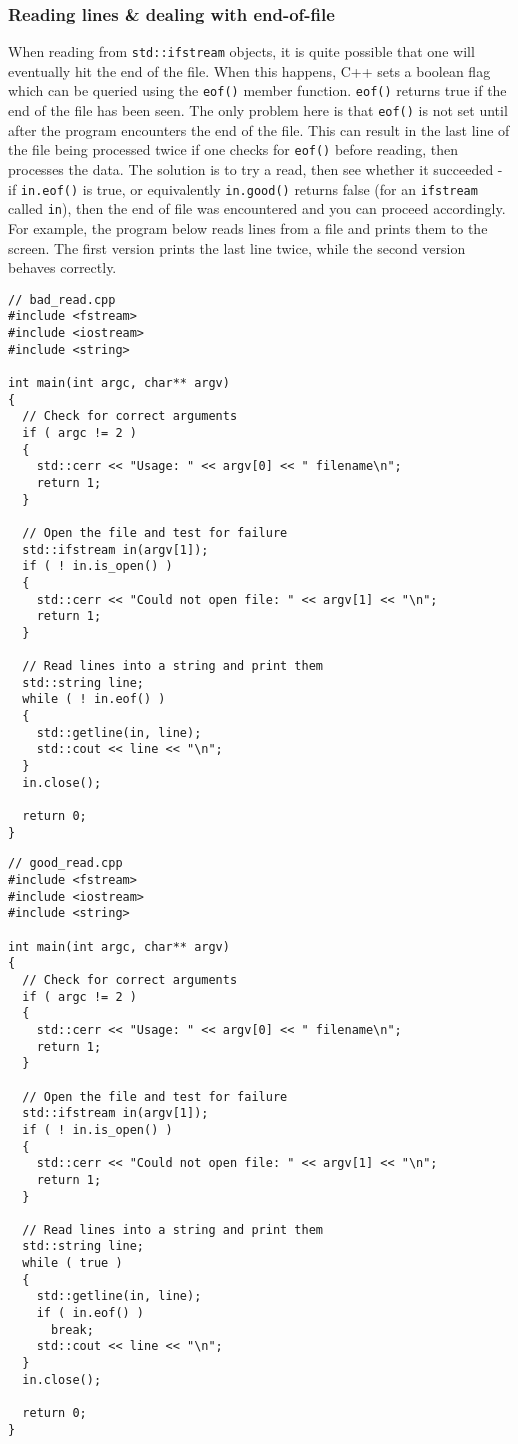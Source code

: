 \documentclass[a4paper]{scrartcl}
\begin{document}
\subsubsection{Reading lines \& dealing with end-of-file}
When reading from \verb|std::ifstream| objects, it is quite possible that one will eventually hit the end of the file. When this happens, C++ sets a boolean flag which can be queried using the \verb|eof()| member function. \verb|eof()| returns true if the end of the file has been seen. The only problem here is that \verb|eof()| is not set until after the program encounters the end of the file. This can result in the last line of the file being processed twice if one checks for \verb|eof()| before reading, then processes the data. The solution is to try a read, then see whether it succeeded - if \verb|in.eof()| is true, or equivalently \verb|in.good()| returns false (for an \verb|ifstream| called \verb|in|), then the end of file was encountered and you can proceed accordingly. For example, the program below reads lines from a file and prints them to the screen. The first version prints the last line twice, while the second version behaves correctly.

\begin{verbatim}
// bad_read.cpp
#include <fstream>
#include <iostream>
#include <string>

int main(int argc, char** argv)
{
  // Check for correct arguments
  if ( argc != 2 )
  {
    std::cerr << "Usage: " << argv[0] << " filename\n";
    return 1;
  }

  // Open the file and test for failure
  std::ifstream in(argv[1]);
  if ( ! in.is_open() )
  {
    std::cerr << "Could not open file: " << argv[1] << "\n";
    return 1;
  }

  // Read lines into a string and print them
  std::string line;
  while ( ! in.eof() )
  {
    std::getline(in, line);
    std::cout << line << "\n";
  }
  in.close();
  
  return 0;
}
\end{verbatim}

\begin{verbatim}
// good_read.cpp
#include <fstream>
#include <iostream>
#include <string>

int main(int argc, char** argv)
{
  // Check for correct arguments
  if ( argc != 2 )
  {
    std::cerr << "Usage: " << argv[0] << " filename\n";
    return 1;
  }

  // Open the file and test for failure
  std::ifstream in(argv[1]);
  if ( ! in.is_open() )
  {
    std::cerr << "Could not open file: " << argv[1] << "\n";
    return 1;
  }

  // Read lines into a string and print them
  std::string line;
  while ( true )
  {
    std::getline(in, line);
    if ( in.eof() )
      break;
    std::cout << line << "\n";
  }
  in.close();

  return 0;
}
\end{verbatim}
\end{document}
